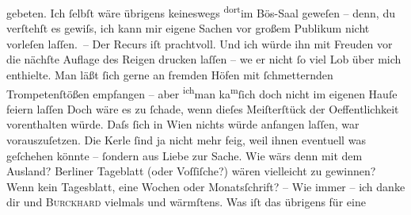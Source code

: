 \begin{ledgroupsized}[t]{13cm}
               gebeten. Ich ſelbſt wäre übrigens keineswegs \substVorne{}\textsuperscript{dort}\substDazwischen{}im Bös-Saal\substHinten{} geweſen – denn, du verſtehſt es gewiſs, ich kann mir eigene Sachen vor
               großem Publikum nicht vorleſen laſſen. –\pend
           \pstart
           Der Recurs iſt prachtvoll. Und ich würde ihn mit Freuden vor die nächſte {\pb}Auflage des Reigen drucken laſſen – we{\geminationn} er nicht ſo viel Lob über mich enthielte. Man läßt
               ſich gerne an fremden Höfen mit ſchmetternden Trompetenſtößen empfangen – aber \substVorne{}\textsuperscript{ich}\substDazwischen{}man\substHinten{} ka{\geminationn}\substVorne{}\textsuperscript{m}\substDazwischen{}ſ\substHinten{}ich doch nicht im eigenen Hauſe feiern laſſen{\dotstwo}
               Doch wäre es zu ſchade, wenn dieſes Meiſterſtück der Oeffentlichkeit vorenthalten
               würde. Daſs ſich in Wien nichts würde anfangen
               laſſen, war vorauszuſetzen. Die Kerle ſind ja nicht mehr feig, weil ihnen even{\pb}tuell was geſchehen
               könnte – ſondern aus Liebe zur Sache. Wie wärs denn mit dem Ausland? Berliner Tageblatt (oder Voſſiſche?) wären vielleicht zu gewinnen? Wenn kein Tagesblatt, eine Wochen
               oder Monatsſchrift? – Wie immer – ich danke dir und \textsc{Burckhard} vielmals und wärmſtens. Was iſt das übrigens für eine \label{K_L01338_1v}
\end{ledgroupsized}
